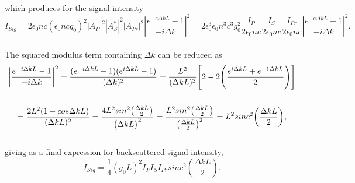 \documentclass[%
  reprint,
  superscriptaddress,
  amsmath,amssymb,
  aps,
  prapplied,
]{revtex4-2}
\begin{document}
which produces for the signal intensity
\\
\begin{equation}
  I_{Sig} = 2\epsilon_{0}nc(\epsilon_{0}ncg_{0})^{2}|A_{P}|^{2}|A_{S}^{*}|^{2}|A_{Pr}|^{2}\left|\frac{e^{-e\Delta kL} - 1}{-i\Delta k}\right|^{2}
  = 2\epsilon_{0}^{3}\epsilon_{0}n^{3}c^{3}g_{0}^{2}\frac{I_{P}}{2\epsilon_{0}nc}\frac{I_{S}}{2\epsilon_{0}nc}\frac{I_{Pr}}{2\epsilon_{0}nc}\left|\frac{e^{-e\Delta kL} - 1}{-i\Delta k}\right|^{2}.
\end{equation}
\\
The squared modulus term containing $\Delta k$ can be reduced as
\\
\begin{gather}
  \bigg|\frac{e^{-i\Delta kL} - 1}{-i\Delta k}\bigg|^{2} = \frac{(e^{-i\Delta kL} - 1)(e^{i\Delta kL} - 1)}{(\Delta k)^{2}} = \frac{L^{2}}{(\Delta kL)^{2}}\Bigg[ 2 - 2\Bigg(\frac{e^{i\Delta kL} + e^{-1\Delta kL}}{2}\Bigg)\Bigg] \notag \\ \notag \\
  = \frac{2L^{2}(1 - cos\Delta kL)}{(\Delta kL)^{2}} = \frac{4L^{2}sin^{2}\big(\frac{\Delta kL}{2}\big)}{\big(\Delta kL\big)^{2}} = \frac{L^{2}sin^{2}\big(\frac{\Delta kL}{2}\big)}{\big(\frac{\Delta kL}{2}\big)^{2}} = L^{2}sinc^{2}\bigg(\frac{\Delta kL}{2}\bigg),
\end{gather}
\\
giving as a final expression for backscattered signal intensity,
\\
\begin{equation}
I_{Sig} = \frac{1}{4}(g_{0}L)^{2}I_{P}I_{S}I_{Pr}sinc^{2}\left(\frac{\Delta kL}{2}\right).
\end{equation}
\\
\end{document}
